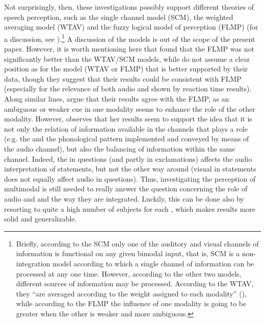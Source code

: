 \documentclass[output=paper]{langsci/langscibook}
\begin{document}
Not surprisingly, then, these investigations possibly support different theories of speech perception, such as the single channel model (SCM), the weighted averaging model (WTAV) and the fuzzy logical model of perception (FLMP) (for a discussion, see \citealt{Massaro1989,MassaroCohen1993,Srinivasan2003}).\footnote{Briefly, according to the SCM only one of the auditory and visual channels of information is functional on any given bimodal input, that is, SCM is a non-integration model according to which a single channel of information can be processed at any one time. However, according to the other two models, different sources of information may be processed. According to the WTAV, they “are averaged according to the weight assigned to each modality” (\citealt[10]{Srinivasan2003}), while according to the FLMP the influence of one modality is going to be greater when the other is weaker and more ambiguous.} A discussion of the models is out of the scope of the present paper. However, it is worth mentioning here that \citet[20]{Srinivasan2003} found that the FLMP was not significantly better than the WTAV\slash SCM models, while \citet{BorrasComes2011} do not assume a clear position as for the model (WTAV or FLMP) that is better supported by their data, though they suggest that their results could be consistent with FLMP (especially for the relevance of both audio and  shown by reaction time results). Along similar lines,  \citet{CrespoSendra2013} argue that their results agree with the FLMP, as an ambiguous or weaker cue in one modality seems to enhance the role of the other modality. However, \citet{GiliFivela2015informazionimultimodali} observes that her results seem to support the idea that it is not only the relation of information available in the channels that plays a role (e.g. the  and the phonological pattern implemented and conveyed by means of the audio channel), but also the balancing of information within the same channel. Indeed,  the  in questions (and partly in exclamations) affects the audio interpretation of statements, but not the other way around (visual in statements does not equally affect audio in questions). Thus, investigating the perception of multimodal  is still needed to really answer the question concerning the role of audio and  and the way they are integrated. Luckily, this can be done also by resorting to quite a high number of subjects for each , which makes results more solid and generalizable.
\end{document}
